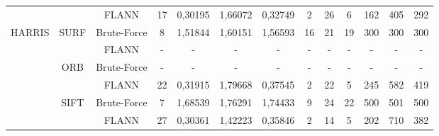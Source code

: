 \begin{table}[h!]
{\begin{tabular}{|c|c|c|c|c|c|c|c|c|c|c|c|c|}
				&                        & FLANN       & 17                         & \cellcolor[HTML]{32CB00}0,30195 & 1,66072                         & \cellcolor[HTML]{32CB00}0,32749 & \cellcolor[HTML]{32CB00}2 & 26                         & \cellcolor[HTML]{32CB00}6 & \cellcolor[HTML]{32CB00}162 & 405 & \cellcolor[HTML]{32CB00}292 \\ \cline{3-13} 
				\multirow{-6}{*}{HARRIS} & \multirow{-2}{*}{SURF} & Brute-Force & 8                          & 1,51844                         & 1,60151                         & 1,56593                         & 16                        & 21                         & 19                        & 300                         & 300 & \cellcolor[HTML]{32CB00}300 \\ \hline
				&                        & FLANN       & -                          & -                               & -                               & -                               & -                         & -                          & -                         & -                           & -   & -                           \\ \cline{3-13} 
				& \multirow{-2}{*}{ORB}  & Brute-Force & -                          & -                               & -                               & -                               & -                         & -                          & -                         & -                           & -   & -                           \\ \cline{2-13} 
				&                        & FLANN       & 22                         & \cellcolor[HTML]{32CB00}0,31915 & 1,79668                         & \cellcolor[HTML]{32CB00}0,37545 & \cellcolor[HTML]{32CB00}2 & 22                         & \cellcolor[HTML]{32CB00}5 & \cellcolor[HTML]{32CB00}245 & 582 & \cellcolor[HTML]{32CB00}419 \\ \cline{3-13} 
				& \multirow{-2}{*}{SIFT} & Brute-Force & 7                          & 1,68539                         & 1,76291                         & 1,74433                         & 9                         & 24                         & 22                        & 500                         & 501 & 500                         \\ \cline{2-13} 
				&                        & FLANN       & \cellcolor[HTML]{32CB00}27 & \cellcolor[HTML]{32CB00}0,30361 & 1,42223                         & \cellcolor[HTML]{32CB00}0,35846 & \cellcolor[HTML]{32CB00}2 & \cellcolor[HTML]{32CB00}14 & \cellcolor[HTML]{32CB00}5 & \cellcolor[HTML]{32CB00}202 & 710 & \cellcolor[HTML]{32CB00}382 \\ \cline{3-13} 

\end{tabular}}
\end{table}
